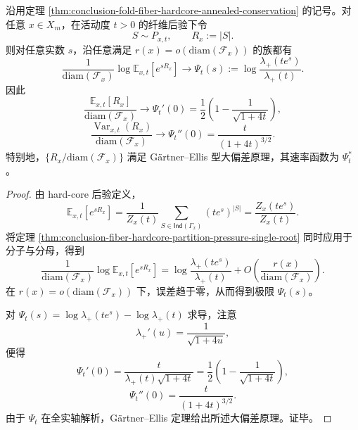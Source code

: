 \begin{theorem}[纤维后验占据数的显式热力学极限]\label{thm:conclusion-fiber-hardcore-occupancy-thermodynamic-limit}
沿用定理 \ref{thm:conclusion-fold-fiber-hardcore-annealed-conservation} 的记号。对任意 \(x\in X_m\)，在活动度 \(t>0\) 的纤维后验下令
\[
S\sim P_{x,t},
\qquad
R_x:=|S|.
\]
则对任意实数 \(s\)，沿任意满足 \(r(x)=o(\mathrm{diam}(\mathcal F_x))\) 的族都有
\[
\frac{1}{\mathrm{diam}(\mathcal F_x)}
\log \mathbb E_{x,t}\!\left[e^{sR_x}\right]
\longrightarrow
\Psi_t(s):=
\log\frac{\lambda_+(te^s)}{\lambda_+(t)}.
\]
因此
\[
\frac{\mathbb E_{x,t}[R_x]}{\mathrm{diam}(\mathcal F_x)}
\longrightarrow
\Psi_t'(0)
=
\frac12\left(1-\frac{1}{\sqrt{1+4t}}\right),
\]
\[
\frac{\operatorname{Var}_{x,t}(R_x)}{\mathrm{diam}(\mathcal F_x)}
\longrightarrow
\Psi_t''(0)
=
\frac{t}{(1+4t)^{3/2}}.
\]
特别地，\(\{R_x/\mathrm{diam}(\mathcal F_x)\}\) 满足 G\"artner--Ellis 型大偏差原理，其速率函数为 \(\Psi_t^\ast\)。
\end{theorem}
\begin{proof}
由 hard-core 后验定义，
\[
\mathbb E_{x,t}[e^{sR_x}]
=
\frac{1}{Z_x(t)}\sum_{S\in\mathsf{Ind}(\Gamma_x)} (te^s)^{|S|}
=
\frac{Z_x(te^s)}{Z_x(t)}.
\]
将定理 \ref{thm:conclusion-fiber-hardcore-partition-pressure-single-root} 同时应用于分子与分母，得到
\[
\frac{1}{\mathrm{diam}(\mathcal F_x)}
\log \mathbb E_{x,t}[e^{sR_x}]
=
\log\frac{\lambda_+(te^s)}{\lambda_+(t)}
+
O\!\left(\frac{r(x)}{\mathrm{diam}(\mathcal F_x)}\right).
\]
在 \(r(x)=o(\mathrm{diam}(\mathcal F_x))\) 下，误差趋于零，从而得到极限 \(\Psi_t(s)\)。

对 \(\Psi_t(s)=\log\lambda_+(te^s)-\log\lambda_+(t)\) 求导，注意
\[
\lambda_+'(u)=\frac{1}{\sqrt{1+4u}},
\]
便得
\[
\Psi_t'(0)=\frac{t}{\lambda_+(t)\sqrt{1+4t}}
=\frac12\left(1-\frac{1}{\sqrt{1+4t}}\right),
\]
\[
\Psi_t''(0)=\frac{t}{(1+4t)^{3/2}}.
\]
由于 \(\Psi_t\) 在全实轴解析，G\"artner--Ellis 定理给出所述大偏差原理。证毕。
\end{proof}


